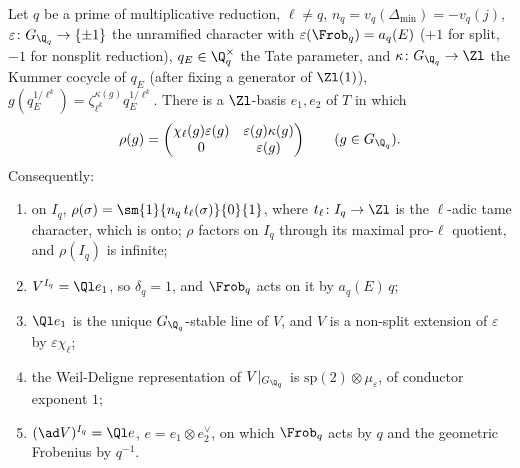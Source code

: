 \begin{theorem}\label{thm:galrep:tate-shape}
Let $q$ be a prime of multiplicative reduction, $\ell\ne q$, $n_q=v_q(\Delta_{\min})=-v_q(j)$, $\varepsilon\colon G_{\Q_q}\to\{\pm1\}$ the unramified character with
$\varepsilon(\Frob_q)=a_q(E)$ ($+1$ for split, $-1$ for nonsplit reduction), $q_E\in\Q_q^\times$ the Tate parameter, and $\kappa\colon G_{\Q_q}\to\Zl$ the Kummer cocycle
of $q_E$ (after fixing a generator of $\Zl(1)$), $g(q_E^{1/\ell^k})=\zeta_{\ell^k}^{\kappa(g)}q_E^{1/\ell^k}$. There is a $\Zl$-basis $e_1,e_2$ of $T$ in which
\[
\rho(g)=\begin{pmatrix}\chi_\ell(g)\varepsilon(g)&\varepsilon(g)\kappa(g)\\0&\varepsilon(g)\end{pmatrix}\qquad(g\in G_{\Q_q}).
\]
Consequently:
\begin{enumerate}[label=(\roman*)]
\item on $I_q$, $\rho(\sigma)=\sm{1}{n_q\,t_\ell(\sigma)}{0}{1}$, where $t_\ell\colon I_q\to\Zl$ is the $\ell$-adic tame character, which is onto; $\rho$ factors on $I_q$
through its maximal pro-$\ell$ quotient, and $\rho(I_q)$ is infinite;
\item $V^{I_q}=\Ql e_1$, so $\delta_q=1$, and $\Frob_q$ acts on it by $a_q(E)\,q$;
\item $\Ql e_1$ is the unique $G_{\Q_q}$-stable line of $V$, and $V$ is a non-split extension of $\varepsilon$ by $\varepsilon\chi_\ell$;
\item the Weil-Deligne representation of $V|_{G_{\Q_q}}$ is $\mathrm{sp}(2)\otimes\mu_\varepsilon$, of conductor exponent $1$;
\item $(\ad V)^{I_q}=\Ql e$, $e=e_1\otimes e_2^\vee$, on which $\Frob_q$ acts by $q$ and the geometric Frobenius by $q^{-1}$.
\end{enumerate}
\end{theorem}

